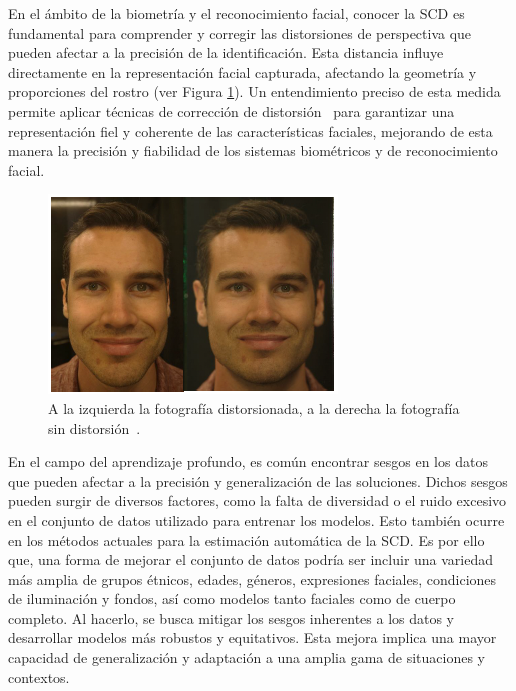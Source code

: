 En el ámbito de la biometría y el reconocimiento facial, conocer la SCD es fundamental para comprender y corregir las distorsiones de perspectiva que pueden afectar a la precisión de la identificación. Esta distancia influye directamente en la representación facial capturada, afectando la geometría y proporciones del rostro (ver Figura \ref{fig2.1}). Un entendimiento preciso de esta medida permite aplicar técnicas de corrección de distorsión~\cite{16,17} para garantizar una representación fiel y coherente de las características faciales, mejorando de esta manera la precisión y fiabilidad de los sistemas biométricos y de reconocimiento facial.

\begin{figure}[h]
	\centering
	\includegraphics[scale=1]{imagenes/cap1/dist-nodist.png}
	\caption{A la izquierda la fotografía distorsionada, a la derecha la fotografía sin distorsión~\cite{17}.}
	\label{fig2.1}
\end{figure}


En el campo del aprendizaje profundo, es común encontrar sesgos \cite{39} en los datos que pueden afectar a la precisión y generalización de las soluciones. Dichos sesgos pueden surgir de diversos factores, como la falta de diversidad o el ruido excesivo en el conjunto de datos utilizado para entrenar los modelos. Esto también ocurre en los métodos actuales para la estimación automática de la SCD. Es por ello que, una forma de mejorar el conjunto de datos podría ser incluir una variedad más amplia de grupos étnicos, edades, géneros, expresiones faciales, condiciones de iluminación y fondos, así como modelos tanto faciales como de cuerpo completo.
Al hacerlo, se busca mitigar los sesgos inherentes a los datos y desarrollar modelos más robustos y equitativos. Esta mejora implica una mayor capacidad de generalización y adaptación a una amplia gama de situaciones y contextos.

